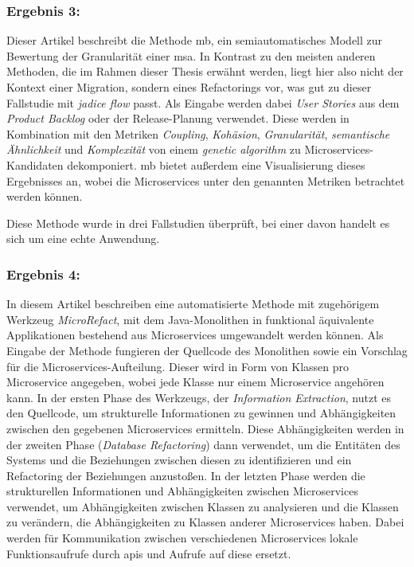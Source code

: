 
\subsubsection{Ergebnis 3:  \cite{arh-result-no-filter-2}}

Dieser Artikel beschreibt die Methode \gls{mb}, ein semiautomatisches Modell zur Bewertung der Granularität einer \gls{msa}.
In Kontrast zu den meisten anderen Methoden, die im Rahmen dieser Thesis erwähnt werden, liegt hier also nicht der Kontext einer Migration, sondern eines Refactorings vor, was gut zu dieser Fallstudie mit \emph{jadice flow} passt.
Als Eingabe werden dabei \emph{User Stories} aus dem \emph{Product Backlog} oder der Release-Planung verwendet.
Diese werden in Kombination mit den Metriken \emph{Coupling}, \emph{Kohäsion}, \emph{Granularität}, \emph{semantische Ähnlichkeit} und \emph{Komplexität} von einem \emph{genetic algorithm} zu Microservices-Kandidaten dekomponiert.
\gls{mb} bietet außerdem eine Visualisierung dieses Ergebnisses an, wobei die Microservices unter den genannten Metriken betrachtet werden können.

Diese Methode wurde in drei Fallstudien überprüft, bei einer davon handelt es sich um eine echte Anwendung.


\subsubsection{Ergebnis 4:  \cite{arh-result-no-filter-4}}

In diesem Artikel beschreiben  eine automatisierte Methode mit zugehörigem Werkzeug \emph{MicroRefact}, mit dem Java-Monolithen in funktional äquivalente Applikationen bestehend aus Microservices umgewandelt werden können.
Als Eingabe der Methode fungieren der Quellcode des Monolithen sowie ein Vorschlag für die Microservices-Aufteilung. Dieser wird in Form von Klassen pro Microservice angegeben, wobei jede Klasse nur einem Microservice angehören kann.
In der ersten Phase des Werkzeugs, der \emph{Information Extraction}, nutzt es den Quellcode, um strukturelle Informationen zu gewinnen und Abhängigkeiten zwischen den gegebenen Microservices ermitteln.
Diese Abhängigkeiten werden in der zweiten Phase (\emph{Database Refactoring}) dann verwendet, um die Entitäten des Systems und die Beziehungen zwischen diesen zu identifizieren und ein Refactoring der Beziehungen anzustoßen.
In der letzten Phase werden die strukturellen Informationen und Abhängigkeiten zwischen Microservices verwendet, um Abhängigkeiten zwischen Klassen zu analysieren und die Klassen zu verändern, die Abhängigkeiten zu Klassen anderer Microservices haben.
Dabei werden für Kommunikation zwischen verschiedenen Microservices lokale Funktionsaufrufe durch \glspl{api} und Aufrufe auf diese ersetzt.

